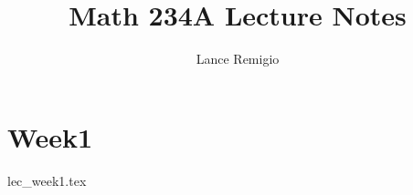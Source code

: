 \documentclass[a4paper]{book}
\title{Math 234A Lecture Notes}
\author{Lance Remigio}
\begin{document}
\maketitle    

\section{Week1}

{lec_week1.tex}
\end{document}
